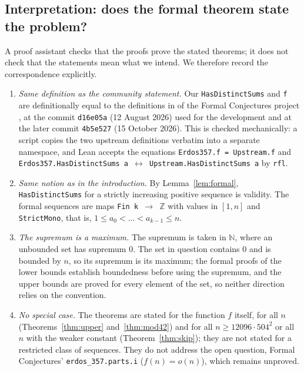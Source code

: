 \documentclass[11pt]{amsart}
\theoremstyle{remark}
\newcommand{\Z}{\mathbb{Z}}
\newcommand{\N}{\mathbb{N}}
\begin{document}
\subsection{Interpretation: does the formal theorem state the problem?}
A proof assistant checks that the proofs prove the stated theorems; it does not check that the statements mean what we intend. We
therefore record the correspondence explicitly.
\begin{enumerate}
\item \emph{Same definition as the community statement.} Our \texttt{HasDistinctSums} and \texttt{f} are definitionally equal to the
definitions in  of the Formal Conjectures project \cite{FormalConjectures}, at the commit
\texttt{d16e05a} (12 August 2026) used for the development and at the later commit \texttt{4b5e527} (15 October 2026). This is checked
mechanically: a script copies the two upstream definitions verbatim into a separate namespace, and Lean accepts the equations
\texttt{Erdos357.f = Upstream.f} and \texttt{Erdos357.HasDistinctSums a $\leftrightarrow$ Upstream.HasDistinctSums a} by \texttt{rfl}.
\item \emph{Same notion as in the introduction.} By Lemma~\ref{lem:formal}, \texttt{HasDistinctSums} for a strictly increasing positive
sequence is validity. The formal sequences are maps \texttt{Fin k $\to$ $\Z$} with values in $[1,n]$ and \texttt{StrictMono}, that is,
$1\le a_0<\dots<a_{k-1}\le n$.
\item \emph{The supremum is a maximum.} The supremum is taken in $\N$, where an unbounded set has supremum $0$. The set in question
contains $0$ and is bounded by $n$, so its supremum is its maximum; the formal proofs of the lower bounds establish boundedness before
using the supremum, and the upper bounds are proved for every element of the set, so neither direction relies on the convention.
\item \emph{No special case.} The theorems are stated for the function $f$ itself, for all $n$ (Theorems~\ref{thm:upper}
and~\ref{thm:mod42}) and for all $n\ge 12096\cdot504^2$ or all $n$ with the weaker constant (Theorem~\ref{thm:skip}); they are not stated
for a restricted class of sequences. They do not address the open question, Formal Conjectures' \texttt{erdos\_357.parts.i}
($f(n)=o(n)$), which remains unproved.
\end{enumerate}
\end{document}
